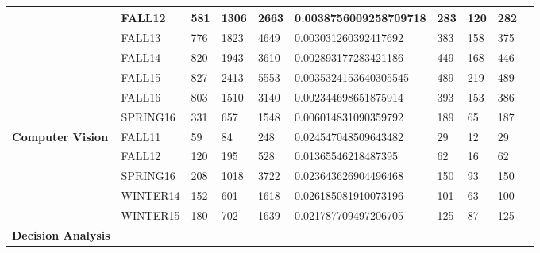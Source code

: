 \begin{table}[]
{\begin{tabular}{@{}llllllllll@{}}
               & FALL12   & 581   & 1306  & 2663                        & 0.0038756009258709718 & 283                 & 120                                          & 282                                        \\ \hline
               & FALL13   & 776   & 1823  & 4649                       & 0.003031260392417692  & 383                 & 158                                          & 375                                        \\ \hline
               & FALL14   & 820   & 1943  & 3610                       & 0.002893177283421186  & 449                 & 168                                          & 446                                        \\ \hline
               & FALL15   & 827   & 2413  & 5553                          & 0.0035324153640305545 & 489                 & 219                                          & 489                                        \\ \hline
               & FALL16   & 803   & 1510  & 3140                           & 0.002344698651875914  & 393                 & 153                                          & 386                                        \\ \hline
               & SPRING16 & 331   & 657   & 1548                           & 0.006014831090359792  & 189                 & 65                                           & 
               187      \\ \hline
\textbf{Computer Vision} & FALL11   & 59    & 84    & 248                             & 0.024547048509643482 & 29                  & 12                                           & 29                                         \\ \hline
       & FALL12   & 120   & 195   & 528                            & 0.01365546218487395  & 62                  & 16                                           & 62                                         \\ \hline
       & SPRING16 & 208   & 1018  & 3722                           & 0.023643626904496468 & 150                 & 93                                           & 150                                        \\ \hline
       & WINTER14 & 152   & 601   & 1618                           & 0.026185081910073196 & 101                 & 63                                           & 100                                        \\ \hline
       & WINTER15 & 180   & 702   & 1639                           & 0.021787709497206705 & 125                 & 87                                           & 125                                                                        \\ \hline
\textbf{Decision Analysis} 
                

\end{tabular}}
\end{table}
